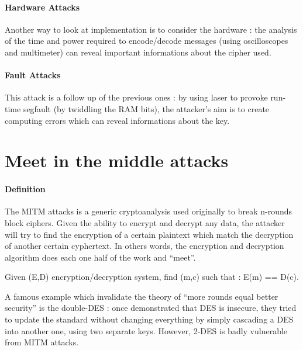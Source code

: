 \paragraph{Hardware Attacks \\}
Another way to look at implementation is to consider the hardware : the analysis of the time and power required to encode/decode messages (using oscilloscopes and multimeter) can reveal important informations about the cipher used.

\paragraph{Fault Attacks \\}
This attack is a follow up of the previous ones : by using laser to provoke run-time segfault (by twiddling the RAM bits), the attacker's aim is to create computing errors which can reveal informations about the key.

\section{Meet in the middle attacks}

\paragraph{Definition\\}
The MITM attacks is a generic cryptoanalysis used originally to break n-rounds block ciphers. Given the ability to encrypt and decrypt any data, the attacker will try to find the encryption of a certain plaintext which match the decryption of another certain cyphertext. In others words, the encryption and decryption algorithm does each one half of the work and ``meet''.

\begin{mydef}
\quad \newline
\begin{minipage}[t]{\textwidth}
\flushright Given (E,D) encryption/decryption system, find (m,c) such that : E(m) == D(c).
\end{minipage}
\end{mydef}


A famous example which invalidate the theory of ``more rounds equal better security'' is the double-DES : once demonstrated that DES is insecure, they tried to update the standard without changing everything by simply cascading a DES into another one, using two separate keys. However, 2-DES is badly vulnerable from MITM attacks.

